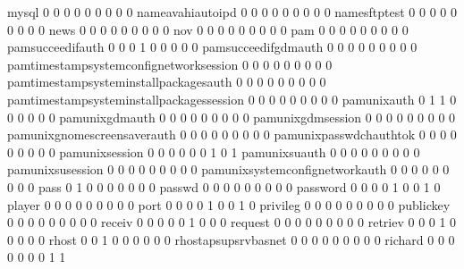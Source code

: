 \documentclass[compress,8pt]{beamer}
\begin{document}
\begin{frame}
\begin{Schunk}
  mysql                                      0   0   0   0   0   0   0   0   0
  nameavahiautoipd                           0   0   0   0   0   0   0   0   0
  namesftptest                               0   0   0   0   0   0   0   0   0
  news                                       0   0   0   0   0   0   0   0   0
  nov                                        0   0   0   0   0   0   0   0   0
  pam                                        0   0   0   0   0   0   0   0   0
  pamsucceedifauth                           0   0   0   1   0   0   0   0   0
  pamsucceedifgdmauth                        0   0   0   0   0   0   0   0   0
  pamtimestampsystemconfignetworksession     0   0   0   0   0   0   0   0   0
  pamtimestampsysteminstallpackagesauth      0   0   0   0   0   0   0   0   0
  pamtimestampsysteminstallpackagessession   0   0   0   0   0   0   0   0   0
  pamunixauth                                0   1   1   0   0   0   0   0   0
  pamunixgdmauth                             0   0   0   0   0   0   0   0   0
  pamunixgdmsession                          0   0   0   0   0   0   0   0   0
  pamunixgnomescreensaverauth                0   0   0   0   0   0   0   0   0
  pamunixpasswdchauthtok                     0   0   0   0   0   0   0   0   0
  pamunixsession                             0   0   0   0   0   0   1   0   1
  pamunixsuauth                              0   0   0   0   0   0   0   0   0
  pamunixsusession                           0   0   0   0   0   0   0   0   0
  pamunixsystemconfignetworkauth             0   0   0   0   0   0   0   0   0
  pass                                       0   1   0   0   0   0   0   0   0
  passwd                                     0   0   0   0   0   0   0   0   0
  password                                   0   0   0   0   1   0   0   1   0
  player                                     0   0   0   0   0   0   0   0   0
  port                                       0   0   0   0   1   0   0   1   0
  privileg                                   0   0   0   0   0   0   0   0   0
  publickey                                  0   0   0   0   0   0   0   0   0
  receiv                                     0   0   0   0   0   1   0   0   0
  request                                    0   0   0   0   0   0   0   0   0
  retriev                                    0   0   0   1   0   0   0   0   0
  rhost                                      0   0   1   0   0   0   0   0   0
  rhostapsupsrvbasnet                        0   0   0   0   0   0   0   0   0
  richard                                    0   0   0   0   0   0   0   1   1

\end{Schunk}
\end{frame}
\end{document}

